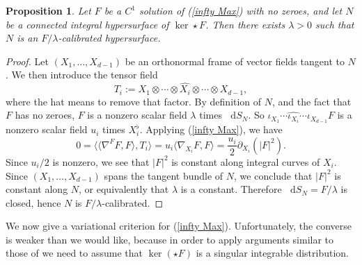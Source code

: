 \documentclass[reqno,11pt]{amsart}
\newcommand*\dif{\mathop{}\!\mathrm{d}}
\newtheorem{proposition}[theorem]{Proposition}
\theoremstyle{definition}
\numberwithin{equation}{section}
\begin{document}
\begin{proposition}\label{infty Max calibrates}
Let $F$ be a $C^1$ solution of (\ref{infty Max}) with no zeroes, and let $N$ be a connected integral hypersurface of $\ker \star F$.
Then there exists $\lambda > 0$ such that $N$ is an $F/\lambda$-calibrated hypersurface.
\end{proposition}
\begin{proof}
Let $(X_1, \dots, X_{d - 1})$ be an orthonormal frame of vector fields tangent to $N$.
We then introduce the tensor field
$$T_i := X_1 \otimes \cdots \otimes \widehat{X_i} \otimes \cdots \otimes X_{d - 1},$$
where the hat means to remove that factor.
By definition of $N$, and the fact that $F$ has no zeroes, $F$ is a nonzero scalar field $\lambda$ times $\dif S_N$.
So $\iota_{X_1} \cdots \widehat{\iota_{X_i}} \cdots \iota_{X_{d - 1}} F$ is a nonzero scalar field $u_i$ times $X_i^\flat$.
Applying (\ref{infty Max}), we have 
$$0 = \langle \langle \nabla^F F, F\rangle, T_i\rangle = u_i \langle \nabla_{X_i} F, F \rangle = \frac{u_i}{2} \partial_{X_i} (|F|^2).$$
Since $u_i/2$ is nonzero, we see that $|F|^2$ is constant along integral curves of $X_i$.
Since $(X_1, \dots, X_{d - 1})$ spans the tangent bundle of $N$, we conclude that $|F|^2$ is constant along $N$, or equivalently that $\lambda$ is a constant.
Therefore $\dif S_N = F/\lambda$ is closed, hence $N$ is $F/\lambda$-calibrated.
\end{proof}

We now give a variational criterion for (\ref{infty Max}).
Unfortunately, the converse is weaker than we would like, because in order to apply arguments similar to those of \cite{Aronsson67,Sheffield12} we need to assume that $\ker(\star F)$ is a singular integrable distribution.
\end{document}

